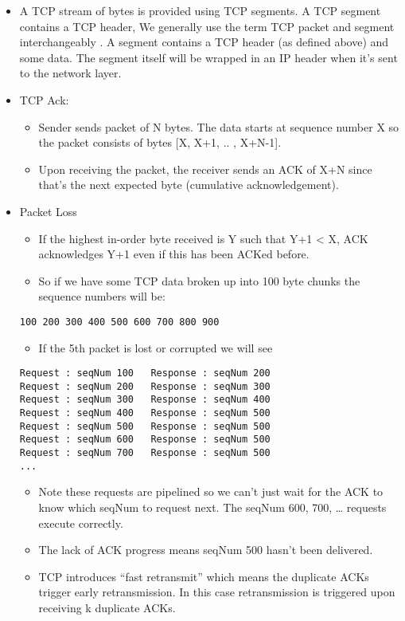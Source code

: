 \documentclass[]{article}
\providecommand{\tightlist}{%
  \setlength{\itemsep}{0pt}\setlength{\parskip}{0pt}}
\begin{document}
\begin{itemize}
\tightlist
\item
  A TCP stream of bytes is provided using TCP segments. A TCP segment
  contains a TCP header, We generally use the term TCP packet and
  segment interchangeably . A segment contains a TCP header (as defined
  above) and some data. The segment itself will be wrapped in an IP
  header when it's sent to the network layer.
\item
  TCP Ack:

  \begin{itemize}
  \tightlist
  \item
    Sender sends packet of N bytes. The data starts at sequence number X
    so the packet consists of bytes {[}X, X+1, .. , X+N-1{]}.
  \item
    Upon receiving the packet, the receiver sends an ACK of X+N since
    that's the next expected byte (cumulative acknowledgement).
  \end{itemize}
\item
  Packet Loss

  \begin{itemize}
  \tightlist
  \item
    If the highest in-order byte received is Y such that Y+1 \textless{}
    X, ACK acknowledges Y+1 even if this has been ACKed before.
  \item
    So if we have some TCP data broken up into 100 byte chunks the
    sequence numbers will be:
  \end{itemize}

\begin{verbatim}
100 200 300 400 500 600 700 800 900 
\end{verbatim}

  \begin{itemize}
  \tightlist
  \item
    If the 5th packet is lost or corrupted we will see
  \end{itemize}

\begin{verbatim}
Request : seqNum 100   Response : seqNum 200 
Request : seqNum 200   Response : seqNum 300 
Request : seqNum 300   Response : seqNum 400
Request : seqNum 400   Response : seqNum 500 
Request : seqNum 500   Response : seqNum 500 
Request : seqNum 600   Response : seqNum 500 
Request : seqNum 700   Response : seqNum 500 
...  
\end{verbatim}

  \begin{itemize}
  \tightlist
  \item
    Note these requests are pipelined so we can't just wait for the ACK
    to know which seqNum to request next. The seqNum 600, 700, \ldots{}
    requests execute correctly.
  \item
    The lack of ACK progress means seqNum 500 hasn't been delivered.
  \item
    TCP introduces ``fast retransmit'' which means the duplicate ACKs
    trigger early retransmission. In this case retransmission is
    triggered upon receiving k duplicate ACKs.


\end{itemize}
\end{itemize}
\end{document}
